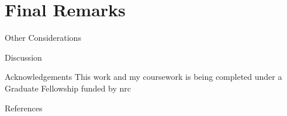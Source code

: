 \documentclass[aspectratio=1610,pdftex,dvipsnames]{beamer}
\newcommand{\acf}{\acrfull} %
\begin{document}
\section{Final Remarks}
\begin{frame}{Other Considerations}
    
\end{frame}

\begin{frame}{Discussion}

\end{frame}

\begin{frame}{Acknowledgements}
    \centering
    This work and my coursework is being completed under a Graduate Fellowship funded by \acf{nrc}
\end{frame}


\begin{frame}{References}
    
    \footnotesize
    
\end{frame}
\end{document}
